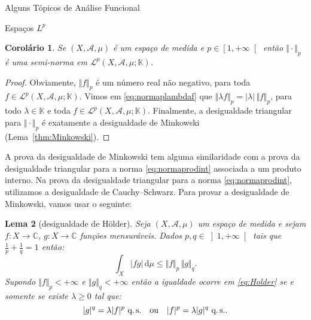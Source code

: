 \documentclass[oneside,final,11pt]{amsbook}
\newcommand{\C}{\mathds C}
\newcommand{\K}{\mathds K}
\newcommand{\dd}{\mathrm d}
\newcommand{\qs}{\hbox{q.$\,$s.}}
\theoremstyle{remark}\newtheorem{exercise}{Exercício}[chapter]
\theoremstyle{remark}\newtheorem{*exercise}[exercise]{\hbox to 0pt{\hskip 0pt minus 1fil*}Exercício}
\theoremstyle{definition}\newtheorem{exdefin}{Definição}[chapter]
\theoremstyle{plain}\newtheorem{teo}{Teorema}[section]
\theoremstyle{plain}\newtheorem{lem}[teo]{Lema}
\theoremstyle{plain}\newtheorem{prop}[teo]{Proposição}
\theoremstyle{plain}\newtheorem{cor}[teo]{Corolário}
\theoremstyle{definition}\newtheorem{defin}[teo]{Definição}
\theoremstyle{remark}\newtheorem{rem}[teo]{Observação}
\theoremstyle{definition}\newtheorem{notation}[teo]{Notação}
\theoremstyle{definition}\newtheorem{convention}[teo]{Convenção}
\theoremstyle{definition}\newtheorem{example}[teo]{Exemplo}
\numberwithin{section}{chapter}
\numberwithin{equation}{section}
\begin{document}
\begin{chapter}{Alguns Tópicos de Análise Funcional}
\begin{section}[Espaços $L^p$]{Espaços ${L^p}$}
\begin{cor}
Se $(X,\mathcal A,\mu)$ é um espaço de medida e $p\in\left[1,+\infty\right[$ então $\Vert\cdot\Vert_p$
é uma semi-norma em $\mathcal L^p(X,\mathcal A,\mu;\K)$.
\end{cor}
\begin{proof}
Obviamente, $\Vert f\Vert_p$ é um número real não negativo, para toda $f\in\mathcal L^p(X,\mathcal A,\mu;\K)$.
Vimos em \eqref{eq:normaplambdaf} que $\Vert\lambda f\Vert_p=\vert\lambda\vert\,\Vert f\Vert_p$, para todo $\lambda\in\K$
e toda $f\in\mathcal L^p(X,\mathcal A,\mu;\K)$. Finalmente, a desigualdade triangular para $\Vert\cdot\Vert_p$ é
exatamente a desigualdade de Minkowski (Lema~\ref{thm:Minkowski}).
\end{proof}

A prova da desigualdade de Minkowski tem alguma similaridade com a prova da desigualdade triangular para
a norma \eqref{eq:normaprodint} associada a um produto interno. Na prova da desigualdade triangular para
a norma \eqref{eq:normaprodint}, utilizamos a desigualdade de Cauchy--Schwarz. Para provar a desigualdade de Minkowski,
vamos usar o seguinte:
\begin{lem}[desigualdade de Hölder]
\label{thm:Holder}
Seja $(X,\mathcal A,\mu)$ um espaço de medida e sejam $f:X\to\C$, $g:X\to\C$ funções mensuráveis. Dados
$p,q\in\left]1,+\infty\right[$ tais que $\frac1p+\frac1q=1$ então:
\begin{equation}\label{eq:Holder}
\int_X\vert fg\vert\,\dd\mu\le\Vert f\Vert_p\,\Vert g\Vert_q.
\end{equation}
Supondo $\Vert f\Vert_p<+\infty$ e $\Vert g\Vert_q<+\infty$ então a igualdade ocorre em \eqref{eq:Holder} se e somente
se existe $\lambda\ge0$ tal que:
\begin{equation}\label{eq:condigHolder}
\vert g\vert^q=\lambda\vert f\vert^p\ \qs\quad\text{ou}\quad\vert f\vert^p=\lambda\vert g\vert^q\ \qs.
\end{equation}
\end{lem}


\end{section}
\end{chapter}
\end{document}
